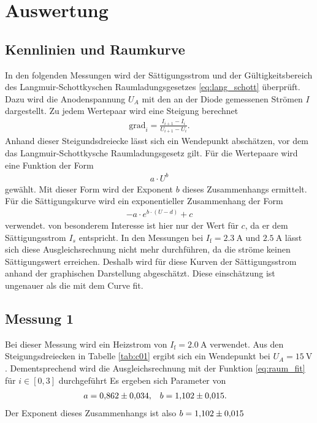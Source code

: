 \section{Auswertung}

\subsection{Kennlinien und Raumkurve}
In den folgenden Messungen wird der Sättigungsstrom und der Gültigkeitsbereich des
Langmuir-Schottkyschen Raumladungsgesetzes \eqref{eq:lang_schott} überprüft.
Dazu wird die Anodenspannung $U_A$ mit den an der Diode gemessenen Strömen $I$ dargestellt.
Zu jedem Wertepaar wird eine Steigung berechnet
\begin{align}
    \text{grad}_{i} = \frac{I_{i+1}-I_{i}}{U_{i+1}- U_{i}}.
\end{align}
Anhand dieser Steigundsdreiecke lässt sich ein Wendepunkt abschätzen, vor dem das Langmuir-Schottkysche Raumladungsgesetz gilt.
Für die Wertepaare wird eine Funktion der Form
\begin{align}
    a \cdot U^{b}
    \label{eq:raum_fit}
\end{align}
gewählt.
Mit dieser Form wird der Exponent $b$ dieses Zusammenhangs ermittelt.
Für die Sättigungskurve wird ein exponentieller Zusammenhang der Form
\begin{align}
    -a \cdot e^{b\cdot (U-d)} + c
    \label{eq:sat}
\end{align}
verwendet.
von besonderem Interesse ist hier nur der Wert für $c$, da er dem Sättigungsstrom $I_s$ entspricht.
In den Messungen bei $I_\text{f} = \qty{2.3}{\ampere}$ und $\qty{2.5}{\ampere}$ lässt sich diese Ausgleichsrechnung nicht mehr
durchführen, da die ströme keinen Sättigungswert erreichen.
Deshalb wird für diese Kurven der Sättigungsstrom anhand der graphischen Darstellung abgeschätzt.
Diese einschätzung ist ungenauer als die mit dem Curve fit.

\subsection{Messung 1}
Bei dieser Messung wird ein Heizstrom von $I_\text{f} = \qty{2.0}{\ampere}$ verwendet.
Aus den Steigungsdreiecken in Tabelle \ref{tab:c01} ergibt sich ein Wendepunkt bei $U_A = \qty{15}{\volt}$.
Dementsprechend wird die Ausgleichsrechnung mit der Funktion \eqref{eq:raum_fit} für $i \in [0,3]$ durchgeführt
Es ergeben sich Parameter von 
\begin{align}
    a &= \num{0.862 \pm 0.034}, & b &= \num{1.102 \pm 0.015}.
\end{align}
Der Exponent dieses Zusammenhangs ist also $b = \num{1.102 \pm 0.015}$

